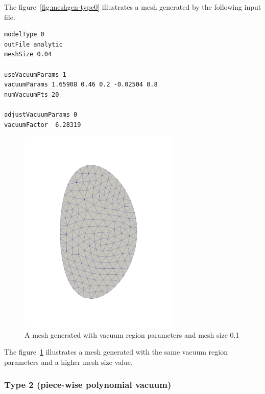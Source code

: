 The figure~\ref{fig:meshgen-type0} illustrates a mesh generated by the following input file.

\begin{verbatim}
modelType 0
outFile analytic 
meshSize 0.04

useVacuumParams 1
vacuumParams 1.65908 0.46 0.2 -0.02504 0.8
numVacuumPts 20

adjustVacuumParams 0
vacuumFactor  6.28319
\end{verbatim}

\begin{figure}
\centering
\includegraphics[width=3in]{./figures/meshgen-type0-ms.pdf}
\caption[Mesh generated with vacuum region parameters and mesh size 0.1]
{A mesh generated with vacuum region parameters and mesh size 0.1}
\label{fig:meshgen-type0-ms}
\end{figure}

The figure~\ref{fig:meshgen-type0-ms} illustrates a mesh generated with the same vacuum region parameters and a higher mesh size value.

\subsubsection{Type 2 (piece-wise polynomial vacuum)}

